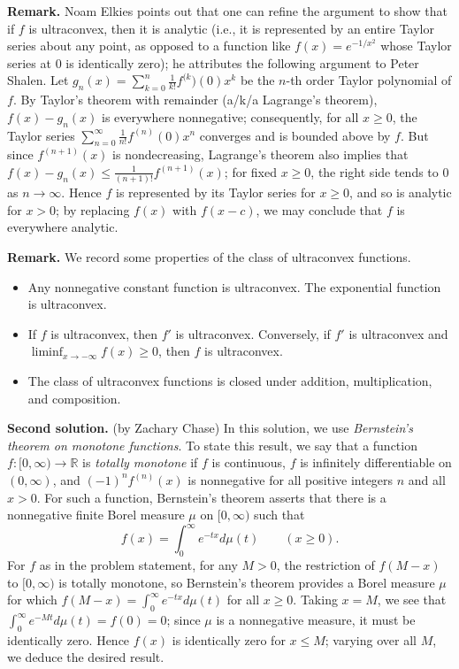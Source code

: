 \documentclass[amssymb,twocolumn,pra,10pt,aps]{revtex4-1}
\begin{document}
\begin{itemize}
\noindent
\textbf{Remark.}
Noam Elkies points out that one can refine the argument to show that
if $f$ is ultraconvex, then it is analytic (i.e., it is represented by an entire Taylor series about any point, as opposed to a function like $f(x) = e^{-1/x^2}$ whose Taylor series at $0$ is identically zero);
he attributes the following argument to 
Peter Shalen. Let $g_n(x) = \sum_{k=0}^n \frac{1}{k!} f^{(k})(0) x^k$ be the $n$-th order Taylor polynomial of $f$.
By Taylor's theorem with remainder (a/k/a Lagrange's theorem), $f(x) - g_n(x)$ is everywhere nonnegative;
consequently, for all $x \geq 0$, the Taylor series $\sum_{n=0}^\infty \frac{1}{n!} f^{(n)}(0) x^n$
converges and is bounded above by $f$. But since $f^{(n+1)}(x)$ is nondecreasing, Lagrange's theorem 
also implies that $f(x) - g_n(x) \leq \frac{1}{(n+1)!} f^{(n+1)}(x)$; for fixed $x \geq 0$, the right side 
tends to 0 as $n \to \infty$. Hence $f$ is represented by its Taylor series for $x \geq 0$, and so
is analytic for $x>0$; by replacing $f(x)$ with $f(x-c)$, we may conclude that $f$ is everywhere analytic.

\noindent
\textbf{Remark.}
We record some properties of the class of ultraconvex functions.
\begin{itemize}
\item
Any nonnegative constant function is ultraconvex. The exponential function is ultraconvex.
\item
If $f$ is ultraconvex, then $f'$ is ultraconvex. Conversely, if $f'$ is ultraconvex and
$\liminf_{x \to -\infty} f(x) \geq 0$, then $f$ is ultraconvex.
\item
The class of ultraconvex functions is closed under addition, multiplication, and composition.
\end{itemize}


\noindent
\textbf{Second solution.} (by Zachary Chase)
In this solution, we use \emph{Bernstein's theorem on monotone functions}.
To state this result, we say that a function $f: [0, \infty) \to \mathbb{R}$ is \emph{totally monotone} if
$f$ is continuous, $f$ is infinitely differentiable on $(0, \infty)$, and $(-1)^n f^{(n)}(x)$ is nonnegative
for all positive integers $n$ and all $x > 0$. For such a function, Bernstein's theorem asserts that there is a nonnegative finite Borel measure $\mu$ on $[0, \infty)$ such that
\[
f(x) = \int_0^\infty e^{-tx} d\mu(t) \qquad (x \geq 0).
\]
For $f$ as in the problem statement, 
for any $M > 0$, the restriction of $f(M-x)$ to $[0, \infty)$ is totally monotone, so Bernstein's theorem provides a Borel measure $\mu$ for which $f(M-x) = \int_0^\infty e^{-tx} d\mu(t)$ for all $x \geq 0$.
Taking $x = M$, we see that $\int_0^\infty e^{-Mt} d\mu(t) = f(0) = 0$; since $\mu$ is a nonnegative measure, it must be identically zero. Hence $f(x)$ is identically zero for $x \leq M$; varying over all $M$, we deduce the desired result.


\end{itemize}
\end{document}
